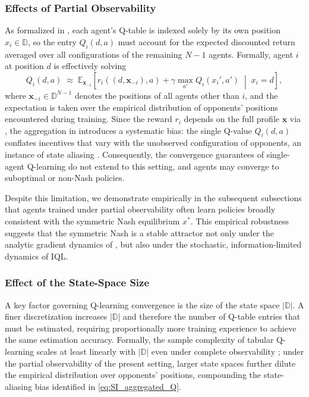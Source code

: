 \documentclass{article}
\begin{document}
            \subsubsection{Effects of Partial Observability}\label{subsubsec:SI_optimal_partial_obs}
                As formalized in , each agent's Q-table is indexed solely by its own position $x_i \in \mathbb{D}$, so the entry $Q_i(d, a)$ must account for the expected discounted return averaged over all configurations of the remaining $N-1$ agents. Formally, agent $i$ at position $d$ is effectively solving
                \begin{equation}\label{eq:SI_aggregated_Q}
                    Q_i(d, a) \;\approx\; \mathbb{E}_{\mathbf{x}_{-i}}\!\left[ r_i\!\left((d, \mathbf{x}_{-i}), a\right) + \gamma \max_{a'} Q_i\!\left(x_i', a'\right) \;\middle|\; x_i = d \right],
                \end{equation}
                where $\mathbf{x}_{-i} \in \mathbb{D}^{N-1}$ denotes the positions of all agents other than $i$, and the expectation is taken over the empirical distribution of opponents' positions encountered during training. Since the reward $r_i$ depends on the full profile $\mathbf{x}$ via , the aggregation in  introduces a systematic bias: the single Q-value $Q_i(d,a)$ conflates incentives that vary with the unobserved configuration of opponents, an instance of state aliasing \cite{watkins1992q}. Consequently, the convergence guarantees of single-agent Q-learning do not extend to this setting, and agents may converge to suboptimal or non-Nash policies.

                Despite this limitation, we demonstrate empirically in the subsequent subsections that agents trained under partial observability often learn policies broadly consistent with the symmetric Nash equilibrium $x^*$. This empirical robustness suggests that the symmetric Nash is a stable attractor not only under the analytic gradient dynamics of , but also under the stochastic, information-limited dynamics of IQL. 
              
    
            \subsubsection{Effect of the State-Space Size}
                A key factor governing Q-learning convergence is the size of the state space $|\mathbb{D}|$. A finer discretization increases $|\mathbb{D}|$ and therefore the number of Q-table entries that must be estimated, requiring proportionally more training experience to achieve the same estimation accuracy. Formally, the sample complexity of tabular Q-learning scales at least linearly with $|\mathbb{D}|$ even under complete observability \cite{watkins1992q}; under the partial observability of the present setting, larger state spaces further dilute the empirical distribution over opponents' positions, compounding the state-aliasing bias identified in \cref{eq:SI_aggregated_Q}.
    
\end{document}
